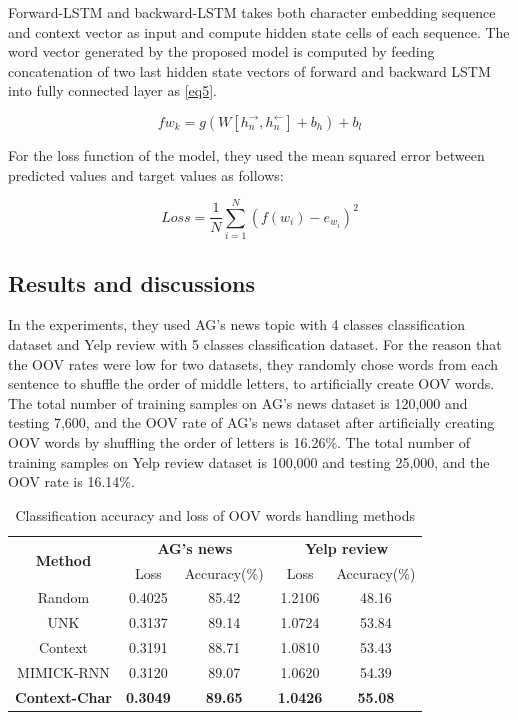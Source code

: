 \documentclass{ieeeaccess}
\begin{document}
Forward-LSTM and backward-LSTM takes both character embedding sequence and context vector as input and compute hidden state cells of each sequence.
The word vector generated by the proposed model is computed by feeding concatenation of two last hidden state vectors of forward and backward LSTM into fully connected layer as \eqref{eq5}.

\begin{equation}
	\label{eq5}
		f{w_k} = g({W[h_n^\rightarrow, h_n^\leftarrow]+b_h}) + b_l
\end{equation}

For the loss function of the model, they used the mean squared error between predicted values and target values as follows:

\begin{equation}
	Loss = \frac{1}{N}\sum_{i=1}^N(f({w_i})-e_{w_i})^2
\end{equation}

\subsection{Results and discussions}
In the experiments, they used AG’s news topic with 4 classes classification dataset and Yelp review with 5 classes classification dataset.
For the reason that the OOV rates were low for two datasets, they randomly chose words from each sentence to shuffle the order of middle letters, to artificially create OOV words.
The total number of training samples on AG's news dataset is 120,000 and testing 7,600, and the OOV rate of AG’s news dataset after artificially creating OOV words by shuffling the order of letters is 16.26\%. 
The total number of training samples on Yelp review dataset is 100,000 and testing 25,000, and the OOV rate is 16.14\%.

\begin{table}[t]
	\centering
	\caption{Classification accuracy and loss of OOV words handling methods}
		\begin{tabular}{|c|c|c|c|c|}
			\hline
			\multirow{2}{*}{\textbf{Method}} & \multicolumn{2}{|c|}{\textbf{AG's news}} & \multicolumn{2}{|c|}{\textbf{Yelp review}} \\ \cline{2-5}
			& Loss & Accuracy(\%) & Loss & Accuracy(\%) \\ \hline \hline
			Random & 0.4025 & 85.42 & 1.2106 & 48.16 \\ \hline
			UNK & 0.3137 & 89.14 & 1.0724 & 53.84 \\ \hline
			Context & 0.3191 & 88.71 & 1.0810 & 53.43 \\ \hline
			MIMICK-RNN & 0.3120 & 89.07 & 1.0620 & 54.39 \\ \hline
			\textbf{Context-Char} & \textbf{0.3049} & \textbf{89.65} & \textbf{1.0426} & \textbf{55.08} \\ \hline
		\end{tabular}
	\label{table6}
\end{table}
\end{document}
